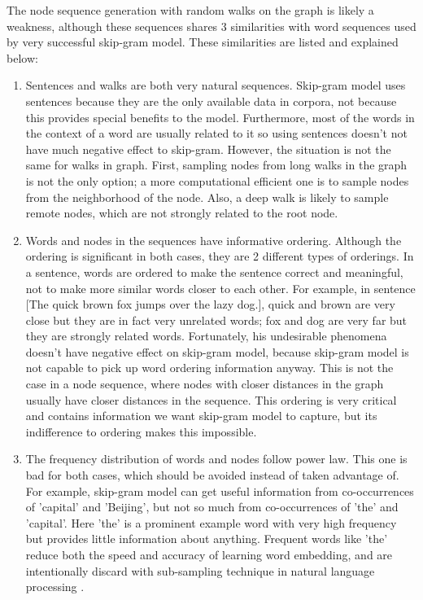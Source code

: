 \documentclass{article}
\begin{document}
The node sequence generation with random walks on the graph is likely a weakness, although these sequences shares 3 similarities with word sequences used by very successful skip-gram model. These similarities are listed and explained below:
\begin{enumerate}
	\item Sentences and walks are both very natural sequences. Skip-gram model uses sentences because they are the only available data in corpora, not because this provides special benefits to the model. Furthermore, most of the words in the context of a word are usually related to it so using sentences doesn't not have much negative effect to skip-gram. However, the situation is not the same for walks in graph. First, sampling nodes from long walks in the graph is not the only option; a more computational efficient one is to sample nodes from the neighborhood of the node. Also, a deep walk is likely to sample remote nodes, which are not strongly related to the root node.
	\item Words and nodes in the sequences have informative ordering. Although the ordering is significant in both cases, they are 2 different types of orderings. In a sentence, words are ordered to make the sentence correct and meaningful, not to make more similar words closer to each other. For example, in sentence [The quick brown fox jumps over the lazy dog.], quick and brown are very close but they are in fact very unrelated words; fox and dog are very far but they are strongly related words. Fortunately, his undesirable phenomena doesn't have negative effect on skip-gram model, because skip-gram model is not capable to pick up word ordering information anyway. This is not the case in a node sequence, where nodes with closer distances in the graph usually have closer distances in the sequence. This ordering is very critical and contains information we want skip-gram model to capture, but its indifference to ordering makes this impossible.
	\item The frequency distribution of words and nodes follow power law. This one is bad for both cases, which should be avoided instead of taken advantage of. For example, skip-gram model can get useful information from co-occurrences of 'capital' and 'Beijing', but not so much from co-occurrences of 'the' and 'capital'. Here 'the' is a prominent example word with very high frequency but provides little information about anything. Frequent words like 'the' reduce both the speed and accuracy of learning word embedding, and are intentionally discard with sub-sampling technique in natural language processing \cite{mikolov2013distributed}.
\end{enumerate}
\end{document}

